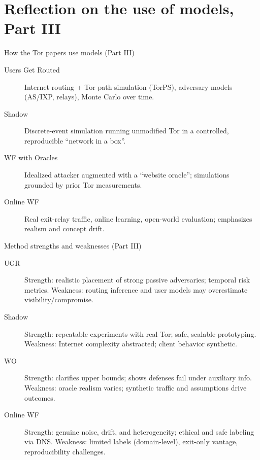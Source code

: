 \documentclass[11pt]{article}
\begin{document}
\section{Reflection on the use of models, Part III}

\begin{frame}{How the Tor papers use models (Part III)}
  \begin{description}
    \item[Users Get Routed] Internet routing + Tor path simulation (TorPS), adversary models (AS/IXP, relays), Monte Carlo over time.
    \item[Shadow] Discrete-event simulation running unmodified Tor in a controlled, reproducible \enquote{network in a box}.
    \item[WF with Oracles] Idealized attacker augmented with a \enquote{website oracle}; simulations grounded by prior Tor measurements.
    \item[Online WF] Real exit-relay traffic, online learning, open-world evaluation; emphasizes realism and concept drift.
  \end{description}
\end{frame}

\begin{frame}{Method strengths and weaknesses (Part III)}
  \begin{description}
    \item[UGR]
      Strength: realistic placement of strong passive adversaries; temporal risk metrics.
      Weakness: routing inference and user models may overestimate visibility/compromise.
    \item[Shadow]
      Strength: repeatable experiments with real Tor; safe, scalable prototyping.
      Weakness: Internet complexity abstracted; client behavior synthetic.
    \item[WO]
      Strength: clarifies upper bounds; shows defenses fail under auxiliary info.
      Weakness: oracle realism varies; synthetic traffic and assumptions drive outcomes.
    \item[Online WF]
      Strength: genuine noise, drift, and heterogeneity; ethical and safe labeling via DNS.
      Weakness: limited labels (domain-level), exit-only vantage, reproducibility challenges.
  \end{description}
\end{frame}
\end{document}
